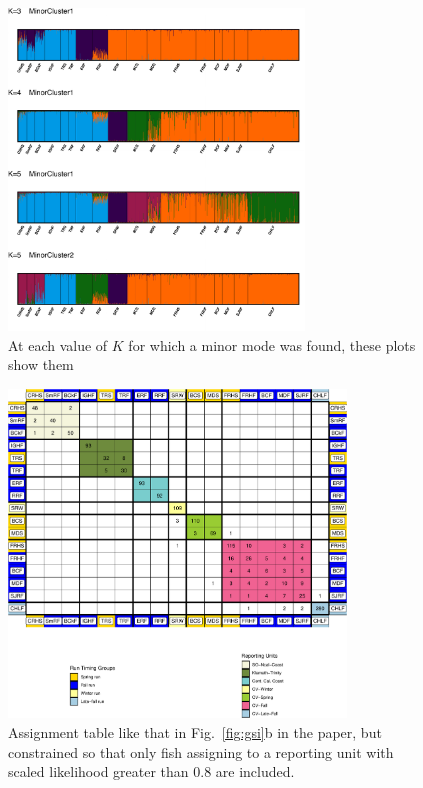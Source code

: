 \begin{figure}
\begin{center}
\includegraphics[width=0.7\textwidth]{images/minor-modes-crop.pdf}
\end{center}
\caption[STRUCTURE minor modes found by CLUMPAK]{\footnotesize At each value of $K$
for which a minor mode was found, these plots show them}
\label{fig:minor-modes}
\end{figure}


\begin{figure}
\begin{center}
\includegraphics[width=0.8\textwidth]{images/ass-table-80-crop.pdf}
\end{center}
\caption[Assignment table for fish with scaled likelihood $ > 0.8$]{\footnotesize Assignment table
like that in Fig.~\ref{fig:gsi}b in the paper, but constrained so that only fish assigning
to a reporting unit with scaled likelihood greater than 0.8 are included.}
\label{fig:eighty}
\end{figure}





